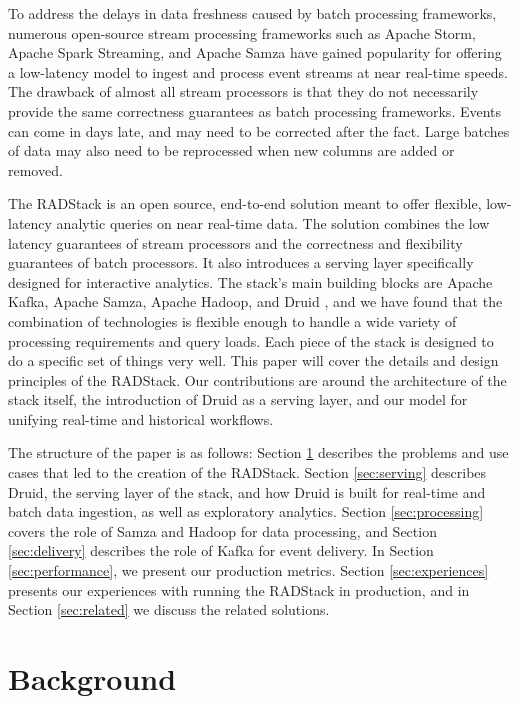 \documentclass{vldb}
\begin{document}
To address the delays in data freshness caused by batch processing
frameworks, numerous open-source stream processing frameworks such as Apache
Storm\cite{marz2013storm}, Apache Spark Streaming\cite{zaharia2012discretized},
and Apache Samza\cite{2014samza} have gained popularity for offering a
low-latency model to ingest and process event streams at near real-time speeds.
The drawback of almost all stream processors is that they do not
necessarily provide the same correctness guarantees as batch processing
frameworks. Events can come in days late, and may need to be corrected after
the fact. Large batches of data may also need to be reprocessed when new
columns are added or removed.

The RADStack is an open source, end-to-end solution meant to offer flexible,
low-latency analytic queries on near real-time data. The solution combines the
low latency guarantees of stream processors and the correctness and flexibility
guarantees of batch processors. It also introduces a serving layer specifically
designed for interactive analytics. The stack’s main building blocks are Apache
Kafka\cite{kreps2011kafka}, Apache Samza, Apache Hadoop, and Druid
\cite{yang2014druid}, and we have found that the combination of technologies is
flexible enough to handle a wide variety of processing requirements and query
loads. Each piece of the stack is designed to do a specific set of things very
well. This paper will cover the details and design principles of the RADStack.
Our contributions are around the architecture of the stack itself, the
introduction of Druid as a serving layer, and our model for unifying real-time
and historical workflows.

The structure of the paper is as follows: Section \ref{sec:background}
describes the problems and use cases that led to the creation of the RADStack.
Section \ref{sec:serving} describes Druid, the serving layer of the stack, and
how Druid is built for real-time and batch data ingestion, as well as
exploratory analytics. Section \ref{sec:processing} covers the role of Samza
and Hadoop for data processing, and Section \ref{sec:delivery} describes the
role of Kafka for event delivery. In Section \ref{sec:performance}, we present
our production metrics.  Section \ref{sec:experiences} presents our experiences
with running the RADStack in production, and in Section \ref{sec:related} we
discuss the related solutions.

\section{Background}
\label{sec:background}
\end{document}
